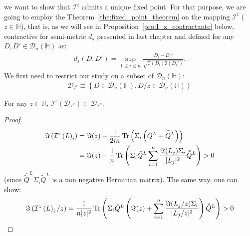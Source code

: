 \documentclass[a4papaer, titlepage]{book}
\begin{document}
we want to show that $\mathcal I^z$ admits a unique fixed point.
For that purpose, we are going to employ the Theorem~\ref{the:fixed_point_theorem} on the mapping $ \mathcal I^z$ ($z \in \mathbb H$), that is, as we will see in Proposition~\ref{pro:I_z_contractante} below, contractive for semi-metric $d_s$ presented in last chapter and defined for any $D, D' \in \mathcal D_n(\mathbb H)$ as:
\begin{align*}
  d_s(D,D') = \sup_{1\leq i \leq n} \frac{|D_i- D_i'|}{\sqrt{\Im(D_i) \Im(D_i')}}.
\end{align*}
We first need to restrict our study on a subset of $\mathcal D_n(\mathbb H)$:
\begin{align*}
  \mathcal D_{I^z} \equiv \left\{ D \in \mathcal D_n(\mathbb H),  D/z \in \mathcal D_n(\mathbb H) \right\}
\end{align*}
\begin{lemma}\label{lem:J_stable_sur_DJ}
    For any $z \in \mathbb H$, $\mathcal I^z(\mathcal D_{\mathcal I^z} ) \subset \mathcal D_{\mathcal I^z} $.
\end{lemma}
\begin{proof}
  \begin{align*}
    \Im \left(\mathcal I^z \left(L\right)_i\right) 
    &= \Im(z) + \frac{1}{2in}\operatorname{Tr}\left(\Sigma_i \left( \tilde Q^L + \bar{\tilde Q}^L \right) \right)\\
    &= \Im(z) + \frac{1}{n}\operatorname{Tr}\left(\Sigma_i \tilde Q^L \sum_{i=1}^n \frac{\Im(L_j)\Sigma_i}{|L_j|^2} \bar {\tilde Q}^L \right) >0
  \end{align*}
  (since $\bar {\tilde Q}^L\Sigma_i \tilde Q^L$ is a non negative Hermitian matrix).
  The same way, one can show:
  \begin{align*}
    \Im \left(\mathcal I^z \left(L\right)_i/z\right) = \frac{1}{n|z|^2}\operatorname{Tr}\left(\Sigma_i \tilde Q^L \left(\Im(z) + \sum_{i=1}^n \frac{\Im(L_j/z)\Sigma_i}{|L_j/z|^2} \right)\bar {\tilde Q}^L \right)> 0
  \end{align*}
\end{proof}
\end{document}
